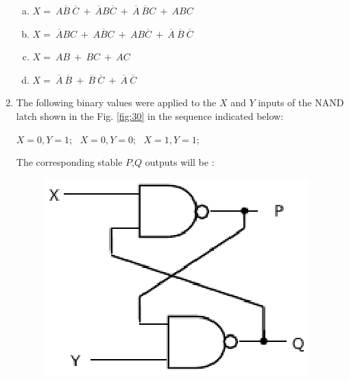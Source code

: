 \documentclass[journal,12pt,twocolumn]{IEEEtran}
\begin{document}
\begin{enumerate}
\begin{figure}
\caption{}

\label{fig:29}

\end{figure} 

 
\begin{enumerate}[(a)]
 
\item $
X=\ A\overline{B} \ \overline{C} \ +\ \overline{A}B\overline{C} \ + \ \overline{A} \ \overline{B}C \ + \ ABC 
$

\item $
X=\ \overline{A}BC \ +\ A\overline{B}C \ + \ AB\overline{C} \ + \ \overline{A}\ \overline{B} \ \overline{C}
$

\item $
X= \ AB \ +\ BC \ + \ AC
$

\item $
X= \ \overline{A} \ \overline{B} \ +\ \overline{B} \ \overline{C} \ + \ \overline{A} \ \overline{C}
$


\end{enumerate}

\item The following binary values were applied to the $X$ and $Y$ inputs of the NAND latch shown in the Fig. \ref{fig:30} in the sequence indicated below:

$ X=0,Y=1$; \ $ X=0,Y=0$; \ $ X=1,Y=1$; \

The corresponding stable $P$,$Q$ outputs will be : 


\begin{figure}

\centering

\includegraphics[width=\columnwidth]{./figs/35.eps}


\end{figure}
\end{enumerate}
\end{document}
